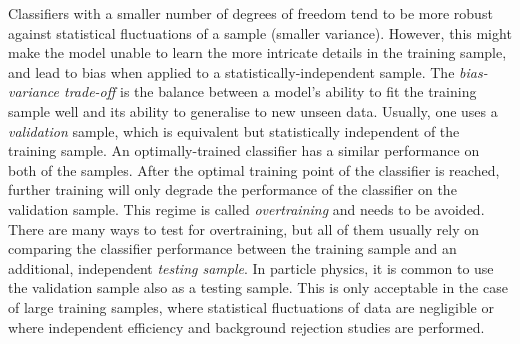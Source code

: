 Classifiers with a smaller number of degrees of freedom tend to be more
robust against statistical fluctuations of a sample (smaller variance).
However, this might make the model unable to learn the more intricate details in the training sample, and lead to bias when applied to a statistically-independent sample.
The \textit{bias-variance trade-off} 
is the balance between a model's ability to fit the training sample well
and its ability to generalise to new unseen data. 
Usually, one uses a \textit{validation} sample, which is equivalent but statistically independent of the training sample.
An optimally-trained classifier has a similar performance on both of the samples. 
After the optimal training point of the classifier is reached, 
further training will only degrade the performance of the classifier on the validation sample.
This regime is called \textit{overtraining} and needs to be avoided.
There are many ways to test for overtraining, but all of them usually rely on comparing the classifier performance between the training sample and an additional, independent \textit{testing sample}.
In particle physics, it is common to use the validation sample also as a testing sample.
This is only acceptable in the case of large training samples, 
where statistical fluctuations of data are negligible or where independent efficiency and background rejection studies are performed.

